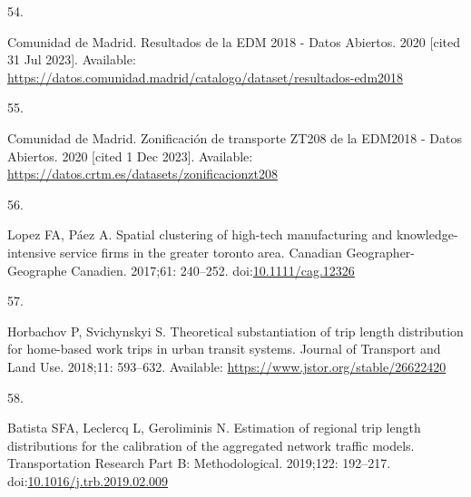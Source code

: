 \documentclass[10pt,letterpaper]{article}
\newlength{\cslhangindent}
\newlength{\csllabelwidth}
\newlength{\cslentryspacingunit} %
\newenvironment{CSLReferences}[2] %
 {%
  \setlength{\parindent}{0pt}
  \ifodd #1
  \let\oldpar\par
  \def\par{\hangindent=\cslhangindent\oldpar}
  \fi
  \setlength{\parskip}{#2\cslentryspacingunit}
 }%
 {}
\newcommand{\CSLLeftMargin}[1]{\parbox[t]{\csllabelwidth}{#1}}
\newcommand{\CSLRightInline}[1]{\parbox[t]{\linewidth - \csllabelwidth}{#1}\break}
\providecommand{\DIFaddbegin}{} %
\providecommand{\DIFaddend}{} %
\providecommand{\DIFdelbegin}{} %
\providecommand{\DIFdelend}{} %
\newcommand{\DIFscaledelfig}{0.5}
\newlength{\DIFdelgraphicswidth} %
\newlength{\DIFdelgraphicsheight} %
\newcommand{\DIFaddincludegraphics}[2][]{{\color{blue}\fbox{\DIFOincludegraphics[#1]{#2}}}} %
\newcommand{\DIFdelincludegraphics}[2][]{%
\sbox{\DIFdelgraphicsbox}{\DIFOincludegraphics[#1]{#2}}%
\settoboxwidth{\DIFdelgraphicswidth}{\DIFdelgraphicsbox} %
\settoboxtotalheight{\DIFdelgraphicsheight}{\DIFdelgraphicsbox} %
\scalebox{\DIFscaledelfig}{%
\parbox[b]{\DIFdelgraphicswidth}{\usebox{\DIFdelgraphicsbox}\\[-\baselineskip] \rule{\DIFdelgraphicswidth}{0em}}\llap{\resizebox{\DIFdelgraphicswidth}{\DIFdelgraphicsheight}{%
\setlength{\unitlength}{\DIFdelgraphicswidth}%
\begin{picture}(1,1)%
\thicklines\linethickness{2pt} %
{\color[rgb]{1,0,0}\put(0,0){\framebox(1,1){}}}%
{\color[rgb]{1,0,0}\put(0,0){\line( 1,1){1}}}%
{\color[rgb]{1,0,0}\put(0,1){\line(1,-1){1}}}%
\end{picture}%
}\hspace*{3pt}}} %
} %
\DeclareRobustCommand{\DIFaddbegin}{\DIFOaddbegin \let\includegraphics\DIFaddincludegraphics} %
\DeclareRobustCommand{\DIFaddend}{\DIFOaddend \let\includegraphics\DIFOincludegraphics} %
\DeclareRobustCommand{\DIFdelbegin}{\DIFOdelbegin \let\includegraphics\DIFdelincludegraphics} %
\DeclareRobustCommand{\DIFdelend}{\DIFOaddend \let\includegraphics\DIFOincludegraphics} %
\begin{document}
\begin{CSLReferences}{0}{0}
\leavevmode{}%
\DIFdelbegin %
\DIFdelend \DIFaddbegin \CSLLeftMargin{54. }\DIFaddend %
\CSLRightInline{Comunidad de Madrid. Resultados de la {EDM} 2018 - Datos
Abiertos. 2020 {[}cited 31 Jul 2023{]}. Available:
\url{https://datos.comunidad.madrid/catalogo/dataset/resultados-edm2018}}

\leavevmode{}%
\DIFdelbegin %
\DIFdelend \DIFaddbegin \CSLLeftMargin{55. }\DIFaddend %
\CSLRightInline{Comunidad de Madrid. Zonificación de transporte ZT208 de
la EDM2018 - Datos Abiertos. 2020 {[}cited 1 Dec 2023{]}. Available:
\url{https://datos.crtm.es/datasets/zonificacionzt208}}

\leavevmode{}%
\DIFdelbegin %
\DIFdelend \DIFaddbegin \CSLLeftMargin{56. }\DIFaddend %
\DIFdelbegin %
\DIFdelend \DIFaddbegin \CSLRightInline{Lopez FA, Páez A. Spatial clustering of high-tech
manufacturing and knowledge-intensive service firms in the greater
toronto area. Canadian Geographer-Geographe Canadien. 2017;61: 240--252.
doi:\href{https://doi.org/10.1111/cag.12326}{10.1111/cag.12326}}
\DIFaddend 

\leavevmode{}%
\DIFdelbegin %
\DIFdelend \DIFaddbegin \CSLLeftMargin{57. }\DIFaddend %
\CSLRightInline{Horbachov P, Svichynskyi S. Theoretical substantiation
of trip length distribution for home-based work trips in urban transit
systems. Journal of Transport and Land Use. 2018;11: 593--632.
Available: \url{https://www.jstor.org/stable/26622420}}

\leavevmode{}%
\DIFdelbegin %
\DIFdelend \DIFaddbegin \CSLLeftMargin{58. }\DIFaddend %
\CSLRightInline{Batista SFA, Leclercq L, Geroliminis N. Estimation of
regional trip length distributions for the calibration of the aggregated
network traffic models. Transportation Research Part B: Methodological.
2019;122: 192--217.
doi:\href{https://doi.org/10.1016/j.trb.2019.02.009}{10.1016/j.trb.2019.02.009}}


\end{CSLReferences}
\end{document}
